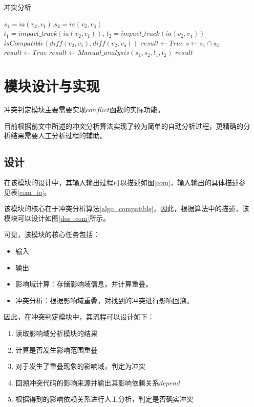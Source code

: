 \begin{algorithm}[H]
	\caption{冲突分析}
	\label{algo_compatible}
	\begin{algorithmic}[1]
		\Require $s_1=ia(v_2,v_1)$,$s_2=ia(v_2,v_4)$\\
		\quad \quad $t_1=impact\_track(ia(v_2,v_1))$, $t_2=impact\_track(ia(v_2,v_4))$
		\Ensure $isCompatible(diff(v_2,v_1), diff(v_2,v_4))$
		\State $result \gets True$
		\Else
		\State $s \gets s_1 \cap s_2$
		\State $result \gets True$
		\Else				
		\State $result \gets Manual\_analysis(s_1, s_2, t_1, t_2)$
		\EndIf 
		\EndIf
		\Return $result$
	\end{algorithmic}
\end{algorithm}


\section{模块设计与实现}
\label {chap_mod}

冲突判定模块主要需要实现$conflict$函数的实际功能。

目前根据前文中所述的冲突分析算法实现了较为简单的自动分析过程，更精确的分析结果需要人工分析过程的辅助。

\subsection{设计}

在该模块的设计中，其输入输出过程可以描述如图\ref {com}，输入输出的具体描述参见表\ref {com_io}。

该模块的核心在于冲突分析算法\ref {algo_compatible}，因此，根据算法中的描述，该模块可以设计如图\ref {des_com}所示。

可见，该模块的核心任务包括：
\begin{itemize}
	\item 输入
	\item 输出
	\item 影响域计算：存储影响域信息，并计算重叠。
	\item 冲突分析：根据影响域重叠，对找到的冲突进行影响回溯。
\end{itemize}


因此，在冲突判定模块中，其流程可以设计如下：
\begin{enumerate}
	\item 读取影响域分析模块的结果
	\item 计算是否发生影响范围重叠
	\item 对于发生了重叠现象的影响域，判定为冲突
	\item 回溯冲突代码的影响来源并输出其影响依赖关系$depend$
	\item 根据得到的影响依赖关系进行人工分析，判定是否确实冲突
\end{enumerate}

